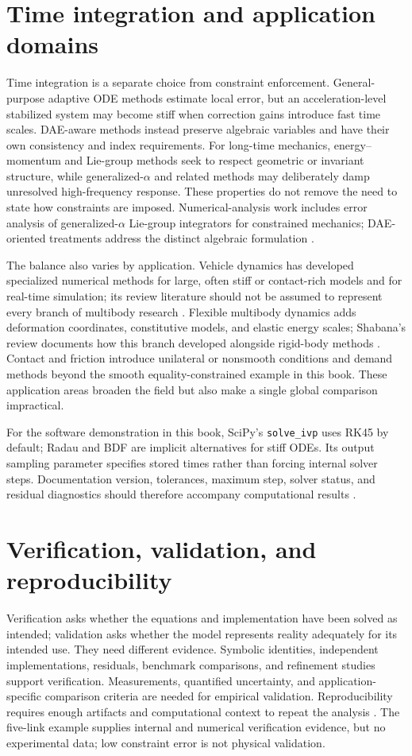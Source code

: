 \section*{Time integration and application domains}
Time integration is a separate choice from constraint enforcement. General-purpose adaptive ODE methods estimate local error, but an acceleration-level stabilized system may become stiff when correction gains introduce fast time scales. DAE-aware methods instead preserve algebraic variables and have their own consistency and index requirements. For long-time mechanics, energy--momentum and Lie-group methods seek to respect geometric or invariant structure, while generalized-$\alpha$ and related methods may deliberately damp unresolved high-frequency response. These properties do not remove the need to state how constraints are imposed. Numerical-analysis work includes error analysis of generalized-$\alpha$ Lie-group integrators for constrained mechanics; DAE-oriented treatments address the distinct algebraic formulation \cite{arnold2015lieerror,hairer2006geometric,arnold2017dae}.

The balance also varies by application. Vehicle dynamics has developed specialized numerical methods for large, often stiff or contact-rich models and for real-time simulation; its review literature should not be assumed to represent every branch of multibody research \cite{arnold2011vehicle}. Flexible multibody dynamics adds deformation coordinates, constitutive models, and elastic energy scales; Shabana's review documents how this branch developed alongside rigid-body methods \cite{shabana1997flexible}. Contact and friction introduce unilateral or nonsmooth conditions and demand methods beyond the smooth equality-constrained example in this book. These application areas broaden the field but also make a single global comparison impractical.

For the software demonstration in this book, SciPy's \texttt{solve\_ivp} uses RK45 by default; Radau and BDF are implicit alternatives for stiff ODEs. Its output sampling parameter specifies stored times rather than forcing internal solver steps. Documentation version, tolerances, maximum step, solver status, and residual diagnostics should therefore accompany computational results \cite{scipy_solve_ivp}.

\section*{Verification, validation, and reproducibility}
Verification asks whether the equations and implementation have been solved as intended; validation asks whether the model represents reality adequately for its intended use. They need different evidence. Symbolic identities, independent implementations, residuals, benchmark comparisons, and refinement studies support verification. Measurements, quantified uncertainty, and application-specific comparison criteria are needed for empirical validation. Reproducibility requires enough artifacts and computational context to repeat the analysis \cite{oberkampfroy2010,sandve2013reproducible}. The five-link example supplies internal and numerical verification evidence, but no experimental data; low constraint error is not physical validation.

